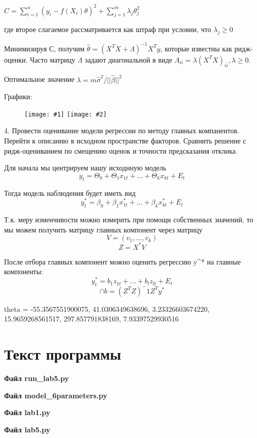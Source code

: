 ﻿\documentclass[12pt, a4paper]{article}
\newcommand{\inputTwoImages}[2]{
\begin{figure}[htbp!]
    \noindent
        \texttt{[image: \#1]}
        \texttt{[image: \#2]}
\end{figure}
}
\newcommand{\myCodeInput}[3]{
{\bf Файл #2}

}
\begin{document}
\(
C = \sum_{i=1}^{n}(y_i - f(X_i)\theta)^2 + \sum_{j=1}^{m}{\lambda_j \theta_j^2} 
\)

где второе слагаемое рассматривается как штраф при условии, что $\lambda_j \geq 0$

Минимизируя С, получим $\hat{\theta} = (X^TX + \Lambda)^{-1}X^Ty$, которые известны как ридж-оценки. Часто матрицу $\Lambda$ задают диагональной в виде $\Lambda_{ii} = \lambda (X^TX)_{ii}, \lambda \geq 0$.

Оптимальное значение $\lambda = m \hat{\sigma}^2 / ||\hat{\beta}||^2$

Графики:

\inputTwoImages{../pics/RSS_from_lambda.png}{../pics/theta_from_lambda.png}



4. Провести оценивание модели регрессии по методу главных компанентов. Перейти к описанию
в исходном пространстве факторов. Сравнить решение с ридж-оцениванием по смещению оценок 
и точности предсказания отклика.

Для начала мы центрируем нашу исходнную модель $$y_t = \Theta_0 + \Theta_1x_{1t}+...+\Theta_kx_{kt}+E_t$$

Тогда модель наблюдения будет иметь вид $$y_t^* = \beta_0 + \beta_1x_{1t}^*+...+\beta_kx_{kt}^*+E_t$$

Т.к. меру изменчивости можно измерить при помощи собственных значений, то мы можем получить матрицу главных компонент через матрицу $$V = (v_1,...,v_k)$$
$$Z = X^*V$$

После отбора главных компонент можно оценить регрессию y^* на главные компоненты:
$$y_t^* = b_1 z_{1t} + ... + b_l z_{lt} + E_t$$
$$\cap{b} = (Z^TZ)^-1 Z^T y^* $$


theta = -55.3567551900075, 41.0306349638696, 3.23326603674220, 15.9659268561517, 297.857791838169, 7.93397529930516

\section{Текст программы}

\myCodeInput{python}{run\_lab5.py}{../../run_lab5.py}

\myCodeInput{python}{model\_6parameters.py}{../../model_6parameters.py}

\myCodeInput{python}{lab1.py}{../../1/lab1.py}
\myCodeInput{python}{lab5.py}{../lab5.py}
\end{document}
